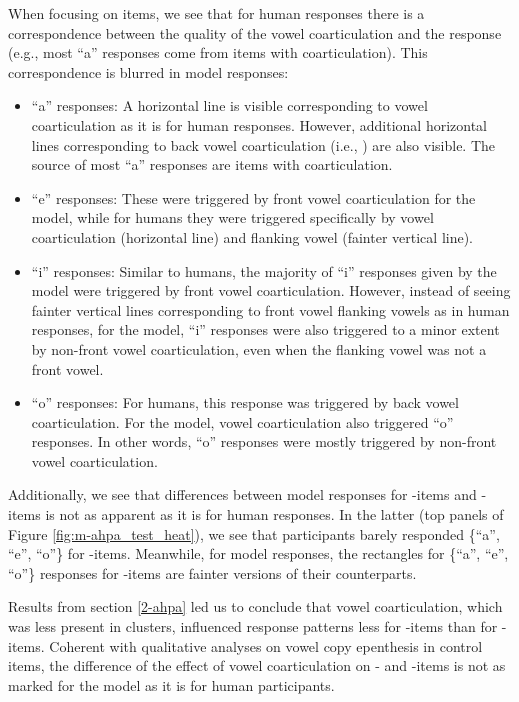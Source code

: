 {When focusing on  items, we see that for human responses there is a correspondence between the quality of the vowel coarticulation and the response (e.g., most ``a'' responses come from items with \textipa{[a]} coarticulation). This correspondence is blurred in model responses:
\begin{itemize}
    \item ``a'' responses: A horizontal line is visible corresponding to \textipa{[a]} vowel coarticulation as it is for human responses. However, additional horizontal lines corresponding to back vowel coarticulation (i.e., \textipa{[o, u]}) are also visible. The source of most ``a'' responses are items with \textipa{[u]} coarticulation.
    \item ``e'' responses: These were triggered by front vowel coarticulation for the model, while for humans they were triggered specifically by \textipa{[e]} vowel coarticulation (horizontal line) and  flanking vowel (fainter vertical line).
    \item ``i'' responses: Similar to humans, the majority of ``i'' responses given by the model were triggered by front vowel coarticulation. However, instead of seeing fainter vertical lines corresponding to front vowel flanking vowels as in human responses, for the model, ``i'' responses were also triggered to a minor extent by non-front vowel coarticulation, even when the flanking vowel was not a front vowel.
    \item ``o'' responses: For humans, this response was triggered by back vowel coarticulation. For the model, \textipa{[a]} vowel coarticulation also triggered ``o'' responses. In other words, ``o'' responses were mostly triggered by non-front vowel coarticulation.
  
  \end{itemize}

  Additionally, we see that differences between model responses for -items and -items is not as apparent as it is for human responses. In the latter (top panels of Figure \ref{fig:m-ahpa_test_heat}), we see that participants barely responded \{``a'', ``e'', ``o''\} for -items. Meanwhile, for model responses, the rectangles for \{``a'', ``e'', ``o''\} responses for -items are fainter versions of their  counterparts.
  
  Results from section \ref{2-ahpa} led us to conclude that vowel coarticulation, which was less present in  clusters, influenced response patterns less for -items than for -items.
  Coherent with qualitative analyses on vowel copy epenthesis in control items, the difference of the effect of vowel coarticulation on - and -items is not as marked for the model as it is for human participants. 

}
